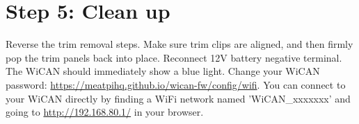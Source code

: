 \documentclass[superscriptaddress,onecolumn,floatfix]{revtex4-2}
\begin{document}
\section{Step 5: Clean up} \label{sect:5}
Reverse the trim removal steps. Make sure trim clips are aligned, and then firmly pop the trim panels back into place. Reconnect 12V battery negative terminal. The WiCAN should immediately show a blue light. Change your WiCAN password: \href{https://meatpihq.github.io/wican-fw/config/wifi}{https://meatpihq.github.io/wican-fw/config/wifi}. You can connect to your WiCAN directly by finding a WiFi network named 'WiCAN\_xxxxxxx' and going to \href{http://192.168.80.1/}{http://192.168.80.1/} in your browser.
\appendix 
\end{document}

